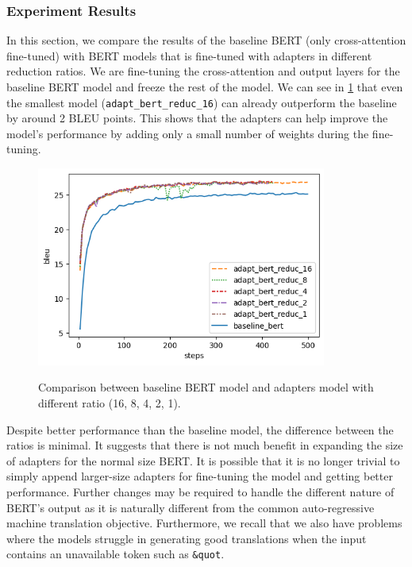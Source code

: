 \subsubsection{Experiment Results}
In this section, we compare the results of the baseline BERT (only cross-attention fine-tuned) with BERT models that is fine-tuned with adapters in different reduction ratios. We are fine-tuning the cross-attention and output layers for the baseline BERT model and freeze the rest of the model. We can see in \cref{img:adapt_bert_ratio} that even the smallest model (\texttt{adapt\_bert\_reduc\_16}) can already outperform the baseline by around 2 BLEU points. This shows that the adapters can help improve the model's performance by adding only a small number of weights during the fine-tuning.

\begin{figure}[]
    {\includegraphics[width=0.85\textwidth]{img/adapter_bert_baseline_adapters.png}}
    \centering
    \caption{Comparison between baseline BERT model and adapters model with different ratio (16, 8, 4, 2, 1).}
    \label{img:adapt_bert_ratio}
\end{figure}

Despite better performance than the baseline model, the difference between the ratios is minimal. It suggests that there is not much benefit in expanding the size of adapters for the normal size BERT. It is possible that it is no longer trivial to simply append larger-size adapters for fine-tuning the model and getting better performance. Further changes may be required to handle the different nature of BERT's output as it is naturally different from the common auto-regressive machine translation objective. Furthermore, we recall that we also have problems where the models struggle in generating good translations when the input contains an unavailable token such as \texttt{\&quot\;}.

